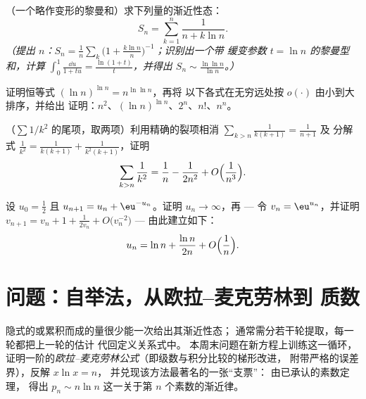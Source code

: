 \begin{exercise}[$\star\star\star$]\label{exo:b2:comparison:9}
（一个略作变形的黎曼和）求下列量的渐近性态：
\[
S_n = \sum_{k=1}^{n} \frac{1}{n + k\ln n} .
\]
\emph{（提出 $n$：$S_n = \frac1n\sum_k \bigl(1 +
\frac{k\ln n}{n}\bigr)^{-1}$；识别出一个带
缓变参数 $t = \ln n$ 的黎曼型和，计算 $\int_0^1
\frac{\dd u}{1 + tu} = \frac{\ln(1+t)}{t}$，并得出 $S_n \sim
\frac{\ln\ln n}{\ln n}$。）}
\end{exercise}

\begin{exercise}[$\star$]\label{exo:b2:comparison:10}
证明恒等式 $(\ln n)^{\ln n} = n^{\ln\ln n}$，再将
以下各式在无穷远处按 $o(\cdot)$ 由小到大排序，并给出
证明：$n^2$、$(\ln n)^{\ln n}$、$2^n$、$n!$、$n^n$。
\end{exercise}

\begin{exercise}[$\star\star$]\label{exo:b2:comparison:11}
（$\sum 1/k^2$ 的尾项，取两项）利用精确的裂项相消
$\sum_{k > n} \frac{1}{k(k+1)} = \frac{1}{n+1}$ 及
分解式 $\frac1{k^2} = \frac{1}{k(k+1)} +
\frac{1}{k^2(k+1)}$，证明
\[
\sum_{k > n} \frac{1}{k^2}
= \frac1n - \frac{1}{2n^2} + O\Bigl(\frac{1}{n^3}\Bigr).
\]
\end{exercise}

\begin{exercise}[$\star\star\star$]\label{exo:b2:comparison:12}
设 $u_0 = \frac12$ 且 $u_{n+1} = u_n + \eu^{-u_n}$。证明
$u_n \to \infty$，再 --- 令 $v_n = \eu^{u_n}$，并证明
$v_{n+1} = v_n + 1 + \frac{1}{2v_n} + O\bigl(v_n^{-2}\bigr)$ ---
由此建立如下：
\[
u_n = \ln n + \frac{\ln n}{2n} + O\Bigl(\frac1n\Bigr).
\]
\end{exercise}

\section{问题：自举法，从欧拉–麦克劳林到
质数}

隐式的或累积而成的量很少能一次给出其渐近性态；
通常需分若干轮提取，每一轮都把上一轮的估计
代回定义关系式中。
本周末问题在新方程上训练这一循环，
证明一阶的\emph{欧拉–麦克劳林公式}（即级数与积分比较的梯形改进，
附带严格的误差界），反解 $x\ln x = n$，
并兑现该方法最著名的一张“支票”：
由已承认的素数定理，
得出 $p_n \sim n\ln n$ 这一关于第 $n$ 个素数的渐近律。

